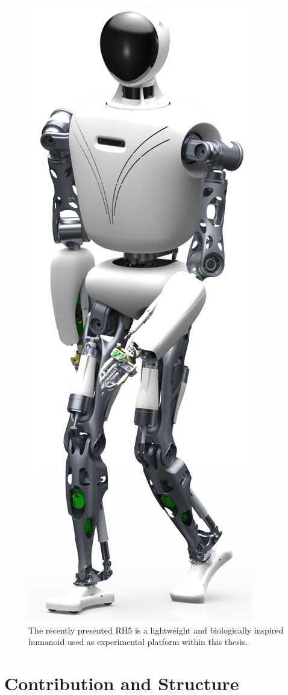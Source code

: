 \begin{figure}[h!]
\centering	
\includegraphics[width=.3\textwidth]{img/rh5_robot.png}
\caption{The recently presented RH5 is a lightweight and biologically inspired humanoid used as experimental platform within this thesis.}
\label{img:rh5_robot}
\end{figure} 


\section{Contribution and Structure}



